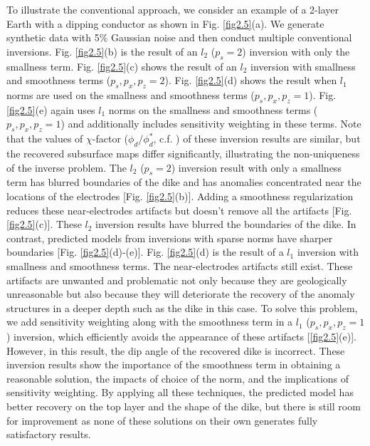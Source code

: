 \documentclass[lettersize,journal]{IEEEtran}
\begin{document}
To illustrate the conventional approach, we consider an example of a 2-layer Earth with a dipping conductor as shown in Fig. \ref{fig2.5}(a). We generate synthetic data with 5$\%$ Gaussian noise and then conduct multiple conventional inversions. Fig. \ref{fig2.5}(b) is the result of an $l_2$ ($p_s = 2$) inversion with only the smallness term. Fig. \ref{fig2.5}(c) shows the result of an $l_2$ inversion with smallness and smoothness terms ($p_s, p_x, p_z = 2$). Fig. \ref{fig2.5}(d) shows the result when $l_1$ norms are used on the smallness and smoothness terms ($p_s, p_x, p_z = 1$). Fig. \ref{fig2.5}(e) again uses $l_1$ norms on the smallness and smoothness terms ($p_s, p_x, p_z = 1$) and additionally includes sensitivity weighting in these terms. Note that the values of $\chi$-factor ($\phi_d / \phi_d^*$, c.f. \cite{ref25}) of these inversion results are similar, but the recovered subsurface maps differ significantly, illustrating the non-uniqueness of the inverse problem. The $l_2$ ($p_s = 2$) inversion result with only a smallness term has blurred boundaries of the dike and has anomalies concentrated near the locations of the electrodes [Fig. \ref{fig2.5}(b)]. Adding a smoothness regularization reduces these near-electrodes artifacts but doesn't remove all the artifacts [Fig. \ref{fig2.5}(c)]. These $l_2$ inversion results have blurred the boundaries of the dike. In contrast, predicted models from inversions with sparse norms have sharper boundaries [Fig. \ref{fig2.5}(d)-(e)]. Fig. \ref{fig2.5}(d) is the result of a $l_1$ inversion with smallness and smoothness terms. The near-electrodes artifacts still exist. These artifacts are unwanted and problematic not only because they are geologically unreasonable but also because they will deteriorate the recovery of the anomaly structures in a deeper depth such as the dike in this case. To solve this problem, we add sensitivity weighting along with the smoothness term in a $l_1$ ($p_s, p_x, p_z = 1$) inversion, which efficiently avoids the appearance of these artifacts [\ref{fig2.5}(e)]. However, in this result, the dip angle of the recovered dike is incorrect. These inversion results show the importance of the smoothness term in obtaining a reasonable solution, the impacts of choice of the norm, and the implications of sensitivity weighting. By applying all these techniques, the predicted model has better recovery on the top layer and the shape of the dike, but there is still room for improvement as none of these solutions on their own generates fully satisfactory results. 
 
\end{document}
